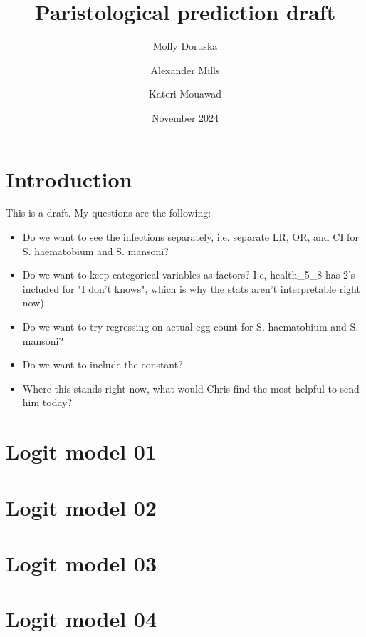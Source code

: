 \documentclass[12pt]{article}
\title{Paristological prediction draft}
\author{ Molly Doruska \and Alexander Mills \and Kateri Mouawad}
\date{\vspace{1ex}November 2024}
\begin{document}
\maketitle

\section{Introduction}
This is a draft. My questions are the following:
\begin{itemize}
    \item Do we want to see the infections separately, i.e. separate LR, OR, and CI for S. haematobium and S. mansoni?
    \item Do we want to keep categorical variables as factors? I.e, health\_5\_8 has 2's included for "I don't knows", which is why the stats aren't interpretable right now)
    \item Do we want to try regressing on actual egg count for S. haematobium and S. mansoni?
    \item Do we want to include the constant?
    \item Where this stands right now, what would Chris find the most helpful to send him today?
\end{itemize}
\tableofcontents 

\section{Logit model 01}








\clearpage
\section{Logit model 02}








\clearpage
\section{Logit model 03}








\clearpage
\section{Logit model 04}







\end{document}
